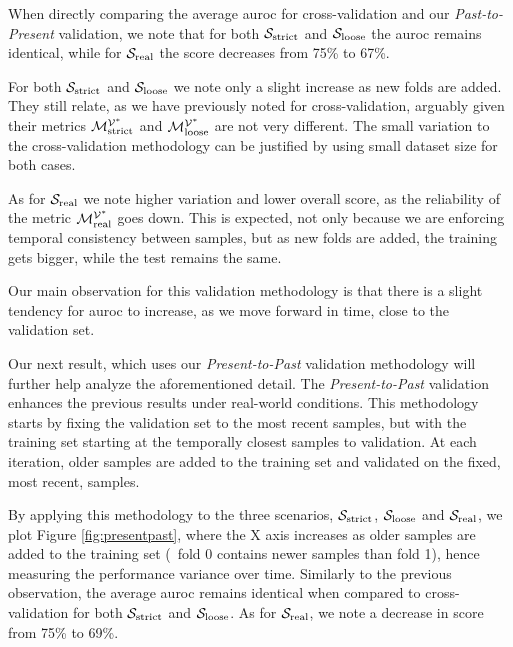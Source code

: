 When directly comparing the average \gls{auroc} for cross-validation and our \textit{Past-to-Present} validation, we note that for both $\mathcal{S}_{\mathrm{strict}}$ and $\mathcal{S}_{\mathrm{loose}}$ the \gls{auroc} remains identical, while for $\mathcal{S}_{\mathrm{real}}$ the score decreases from 75\% to 67\%.

For both $\mathcal{S}_{\mathrm{strict}}$ and $\mathcal{S}_{\mathrm{loose}}$ we note only a slight increase as new folds are added.
They still relate, as we have previously noted for cross-validation, arguably given their metrics $\mathcal{M}_{\mathrm{strict}}^{\mathcal{V}^*}$ and $\mathcal{M}_{\mathrm{loose}}^{\mathcal{V}^*}$ are not very different.
The small variation to the cross-validation methodology can be justified by using small dataset size for both cases.

As for $\mathcal{S}_{\mathrm{real}}$ we note higher variation and lower overall score, as the reliability of the metric $\mathcal{M}_{\mathrm{real}}^{\mathcal{V}^*}$ goes down.
This is expected, not only because we are enforcing temporal consistency between samples, but as new folds are added, the training gets bigger, while the test remains the same.

Our main observation for this validation methodology is that there is a slight tendency for \gls{auroc} to increase, as we move forward in time, close to the validation set.

\medskip

Our next result, which uses our \textit{Present-to-Past} validation methodology will further help analyze the aforementioned detail.
The \textit{Present-to-Past} validation enhances the previous results under real-world conditions.
This methodology starts by fixing the validation set to the most recent samples, but with the training set starting at the temporally closest samples to validation.
At each iteration, older samples are added to the training set and validated on the fixed, most recent, samples.

By applying this methodology to the three scenarios, $\mathcal{S}_{\mathrm{strict}}$, $\mathcal{S}_{\mathrm{loose}}$ and $\mathcal{S}_{\mathrm{real}}$, we plot Figure \ref{fig:presentpast}, where the X axis increases as older samples are added to the training set (\ie\ fold 0 contains newer samples than fold 1), hence measuring the performance variance over time.
Similarly to the previous observation, the average \gls{auroc} remains identical when compared to cross-validation for both $\mathcal{S}_{\mathrm{strict}}$ and $\mathcal{S}_{\mathrm{loose}}$.
As for $\mathcal{S}_{\mathrm{real}}$, we note a decrease in score from 75\% to 69\%.

